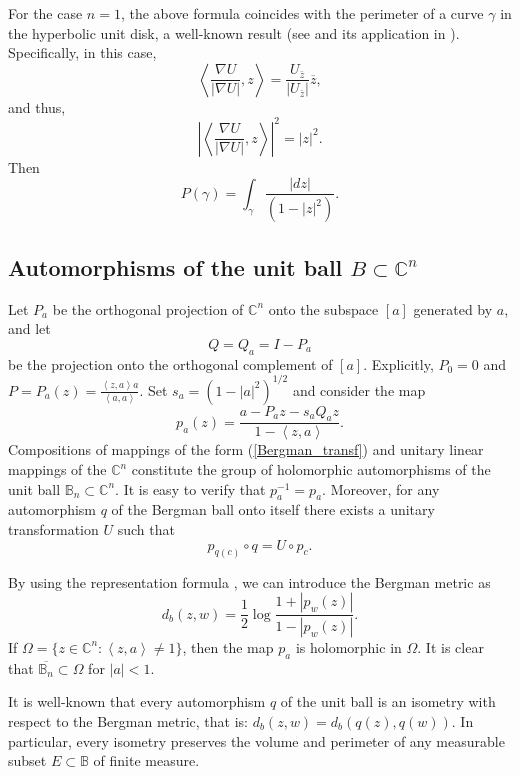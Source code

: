 \documentclass[11pt]{amsart}
\numberwithin{equation}{section}
\begin{document}
For the case \( n=1 \), the above formula coincides with the perimeter of a curve \( \gamma \) in the hyperbolic unit disk, a well-known result (see \cite{14} and its application in \cite{kulik}). Specifically, in this case,
\[
\left\langle \frac{\nabla U}{|\nabla U|}, z \right\rangle = \frac{U_{\bar{z}}}{|U_{\bar{z}}|} \overline{z},
\]
and thus,
\[
\left| \left\langle \frac{\nabla U}{|\nabla U|}, z \right\rangle \right|^2 = |z|^2.
\] Then $$P(\gamma)=\int_{\gamma}\frac{|dz|}{(1-|z|^2)}.$$

\subsection{Automorphisms of the unit ball $B\subset \mathbb{C}^n$}\label{sub2}

Let $P_a$ be the
orthogonal projection of $\mathbb{C}^n$ onto the subspace $[a]$ generated by $a$, and let $$Q=Q_a =
I - P_a$$ be the projection onto the orthogonal complement of $[a]$. Explicitly, $P_0 = 0$ and  $P=P_a(z) =\frac{\left<z,a\right> a}{\left<a, a\right>}$. Set $s_a = (1 - |a|^2)^{1/2}$ and consider the map
\begin{equation}
\label{Bergman_transf}
p_a(z) =\frac{a-P_a z-s_a Q_a z}{1-\left<z,a\right>}.
\end{equation}
Compositions of mappings of the form (\ref{Bergman_transf}) and unitary linear mappings of the $\mathbb{C}^n$ constitute the group of holomorphic automorphisms of the unit ball $\mathbb{B}_n\subset \mathbb{C}^n$. It is easy to verify that $p_a^{-1}=p_a$. Moreover, for any automorphism $q$ of the Bergman ball onto itself there exists a unitary transformation $U$ such that \begin{equation}\label{automob}p_{q(c)}\circ q=U\circ p_c.\end{equation}

By using the representation formula \cite[Proposition~1.21]{kezu}, we can introduce the Bergman metric as \begin{equation}\label{bergmet}d_b(z,w)=\frac{1}{2}\log\frac{1+|p_w(z)|}{1-|p_w(z)|}.\end{equation}
If $\Omega= \{z\in \mathbb{C}^n:\left<z,a\right>\neq 1\}$,  then the map $p_a$  is holomorphic in $\Omega$. It is clear that $\overline{\mathbb{B}_n}\subset \Omega$ for $|a| < 1.$

It is well-known that every automorphism $q$ of the unit ball is an isometry with respect  to the Bergman metric, that is: $d_b(z,w)=d_b(q(z),q(w))$. In particular, every isometry preserves the volume and perimeter of any measurable subset $E\subset \mathbb{B}$ of finite measure.
\end{document}
